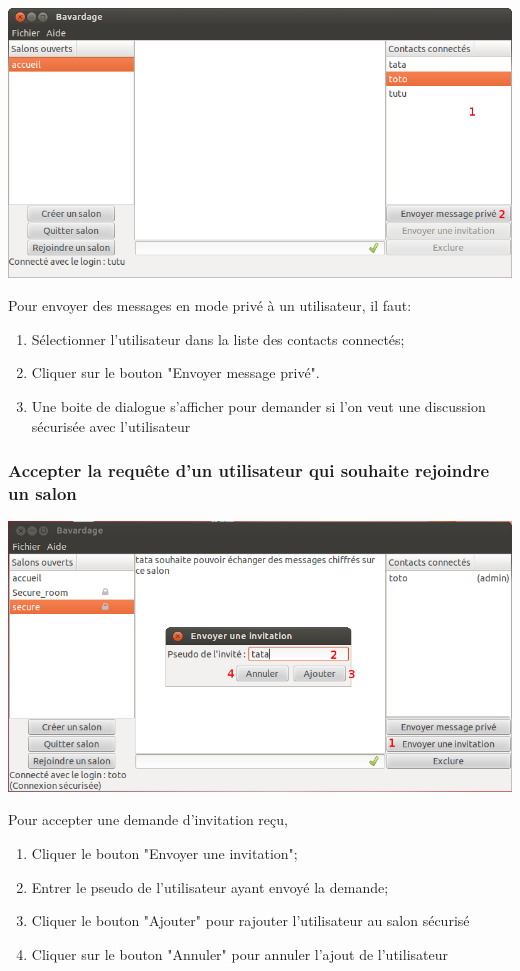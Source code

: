 \documentclass[a4paper,11pt,french]{book}
\begin{document}
\includegraphics[width=45em]{capture/mp_nsec.png}

Pour envoyer des messages en mode privé à un utilisateur, il faut:

\begin{enumerate}
    \item Sélectionner l'utilisateur dans la liste des contacts connectés;
    \item Cliquer sur le bouton "Envoyer message privé".
    \item Une boite de dialogue s'afficher pour demander si l'on veut une discussion sécurisée avec l'utilisateur 
\end{enumerate}

\subsubsection{Accepter la requête d'un utilisateur qui souhaite rejoindre un salon}

\includegraphics[width=45em]{capture/invit_room.png}

Pour accepter une demande d'invitation reçu,
\begin{enumerate}
    \item Cliquer le bouton "Envoyer une invitation";
    \item Entrer le pseudo de l'utilisateur ayant envoyé la demande;
    \item Cliquer le bouton "Ajouter" pour rajouter l'utilisateur au salon sécurisé
    \item Cliquer sur le bouton "Annuler" pour annuler l'ajout de l'utilisateur
\end{enumerate}
\end{document}
